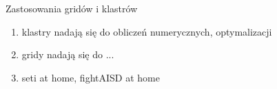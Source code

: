 \documentclass{beamer}
\begin{document}
\begin{frame}{Zastosowania gridów i klastrów}
  \begin{enumerate}
  \item klastry nadają się do obliczeń numerycznych, optymalizacji
  \item gridy nadają się do ...
  \item seti at home, fightAISD at home
  \end{enumerate}
\end{frame}
\end{document}
